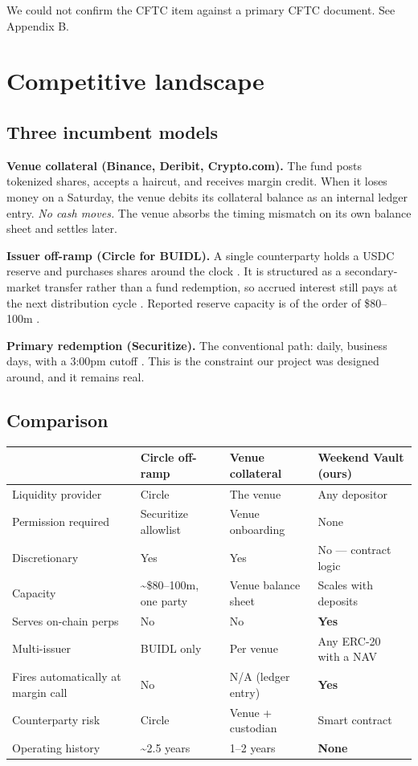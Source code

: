 \documentclass[11pt,a4paper]{article}
\newcommand{\note}[1]{{\small\color{muted}#1}}
\begin{document}
\note{We could not confirm the CFTC item against a primary CFTC document. See Appendix B.}

\section{Competitive landscape}

\subsection{Three incumbent models}

\textbf{Venue collateral (Binance, Deribit, Crypto.com).} The fund posts tokenized shares, accepts a
haircut, and receives margin credit. When it loses money on a Saturday, the venue debits its
collateral balance as an internal ledger entry. \emph{No cash moves.} The venue absorbs the timing
mismatch on its own balance sheet and settles later.

\textbf{Issuer off-ramp (Circle for BUIDL).} A single counterparty holds a USDC reserve and purchases
shares around the clock \cite{circle}. It is structured as a secondary-market transfer rather than a
fund redemption, so accrued interest still pays at the next distribution cycle \cite{techflow}.
Reported reserve capacity is of the order of \$80--100m \cite{techflow,bitcoincom}.

\textbf{Primary redemption (Securitize).} The conventional path: daily, business days, with a 3:00pm
cutoff \cite{techflow}. This is the constraint our project was designed around, and it remains real.

\subsection{Comparison}

\begin{center}
\small
\begin{tabular}{@{}p{4.3cm}p{2.9cm}p{2.9cm}p{3.5cm}@{}}
\toprule
& \textbf{Circle off-ramp} & \textbf{Venue collateral} & \textbf{Weekend Vault (ours)} \\
\midrule
Liquidity provider & Circle & The venue & Any depositor \\
Permission required & Securitize allowlist & Venue onboarding & None \\
Discretionary & Yes & Yes & No — contract logic \\
Capacity & \textasciitilde\$80--100m, one party & Venue balance sheet & Scales with deposits \\
Serves on-chain perps & No & No & \textbf{Yes} \\
Multi-issuer & BUIDL only & Per venue & Any ERC-20 with a NAV \\
Fires automatically at margin call & No & N/A (ledger entry) & \textbf{Yes} \\
Counterparty risk & Circle & Venue + custodian & Smart contract \\
Operating history & \textasciitilde2.5 years & 1--2 years & \textbf{None} \\
\bottomrule
\end{tabular}
\end{center}
\end{document}

